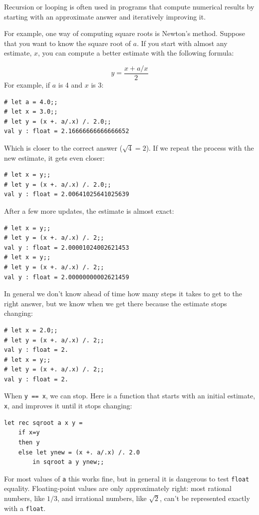 \documentclass[10pt]{book}
\begin{document}

Recursion or looping is often used in programs that compute
numerical results by starting with an approximate answer and
iteratively improving it.


For example, one way of computing square roots is Newton's method.
Suppose that you want to know the square root of $a$.  If you start
with almost any estimate, $x$, you can compute a better
estimate with the following formula:

\[ y = \frac{x + a/x}{2} \]
%
For example, if $a$ is 4 and $x$ is 3:

\beforeverb
\begin{verbatim}
# let a = 4.0;;
# let x = 3.0;;
# let y = (x +. a/.x) /. 2.0;;
val y : float = 2.16666666666666652
\end{verbatim}
\afterverb
%
Which is closer to the correct answer ($\sqrt{4} = 2$).  If we
repeat the process with the new estimate, it gets even closer:

\beforeverb
\begin{verbatim}
# let x = y;;
# let y = (x +. a/.x) /. 2.0;;
val y : float = 2.00641025641025639
\end{verbatim}
\afterverb
%
After a few more updates, the estimate is almost exact:

\beforeverb
\begin{verbatim}
# let x = y;;
# let y = (x +. a/.x) /. 2;;
val y : float = 2.00001024002621453
# let x = y;;
# let y = (x +. a/.x) /. 2;;
val y : float = 2.00000000002621459
\end{verbatim}
\afterverb
%
In general we don't know ahead of time how many steps it takes
to get to the right answer, but we know when we get there
because the estimate
stops changing:

\beforeverb
\begin{verbatim}
# let x = 2.0;;
# let y = (x +. a/.x) /. 2;;
val y : float = 2.
# let x = y;;
# let y = (x +. a/.x) /. 2;;
val y : float = 2.
\end{verbatim}
\afterverb
%
When {\tt y == x}, we can stop.  Here is a function that starts
with an initial estimate, {\tt x}, and improves it until it
stops changing:

\beforeverb
\begin{verbatim}
let rec sqroot a x y = 
	if x=y
	then y
	else let ynew = (x +. a/.x) /. 2.0
		in sqroot a y ynew;;
\end{verbatim}
\afterverb
%
For most values of {\tt a} this works fine, but in general it is
dangerous to test {\tt float} equality.
Floating-point values are only approximately right:
most rational numbers, like $1/3$, and irrational numbers, like
$\sqrt{2}$, can't be represented exactly with a {\tt float}.
\end{document}
